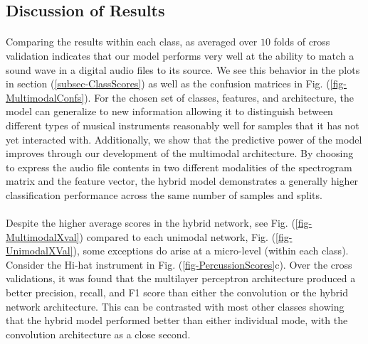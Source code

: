 \documentclass[12pt,letterpaper]{article}
\begin{document}

\subsection{Discussion of Results}

\paragraph*{}Comparing the results within each class, as averaged over $10$ folds of cross validation indicates that our model performs very well at the ability to match a sound wave in a digital audio files to its source. We see this behavior in the plots in section (\ref{subsec-ClassScores}) as well as the confusion matrices in Fig. (\ref{fig-MultimodalConfs}). For the chosen set of classes, features, and architecture, the model can generalize to new information allowing it to distinguish between different types of musical instruments reasonably well for samples that it has not yet interacted with. Additionally, we show that the predictive power of the model improves through our development of the multimodal architecture. By choosing to express the audio file contents in two different modalities of the spectrogram matrix and the feature vector, the hybrid model demonstrates a generally higher classification performance across the same number of samples and splits. 

\paragraph*{}Despite the higher average scores in the hybrid network, see Fig. (\ref{fig-MultimodalXval}) compared to each unimodal network, Fig. (\ref{fig-UnimodalXVal}), some exceptions do arise at a micro-level (within each class). Consider the Hi-hat instrument in Fig. (\ref{fig-PercussionScores}c). Over the cross validations, it was found that the multilayer perceptron architecture produced a better precision, recall, and F1 score than either the convolution or the hybrid network architecture. This can be contrasted with most other classes showing that the hybrid model performed better than either individual mode, with the convolution architecture as a close second. 
\end{document}
